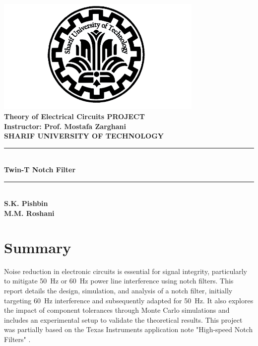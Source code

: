 \documentclass[hidelinks,12pt]{article}
\begin{document}
	
	\begin{titlepage}
		\begin{center}
			\includegraphics[width=10cm]{figures/SUT_logo.png} \\
			\vspace{1cm}
			\textbf{\Large Theory of Electrical Circuits PROJECT}\\
			\vspace{0.5cm}
			\textbf{Instructor: Prof. Mostafa Zarghani}\\
			\vspace{1cm}
			\textbf{SHARIF UNIVERSITY OF TECHNOLOGY}\\
			\vspace{1cm}
			\rule{\linewidth}{0.5mm} \\
			\vspace{0.5cm}
			{\Huge \textbf{Twin-T Notch Filter}}\\
			\vspace{0.3cm}
			\rule{\linewidth}{0.5mm} \\
			\vfill
			\textbf{\Large S.K. Pishbin}
			\\
			\textbf{\Large M.M. Roshani}
		\end{center}
	\end{titlepage}
	
	\tableofcontents
	
	\newpage
	\section{Summary}
	Noise reduction in electronic circuits is essential for signal integrity, particularly to mitigate 50~Hz or 60~Hz power line interference using notch filters. This report details the design, simulation, and analysis of a notch filter, initially targeting 60~Hz interference and subsequently adapted for 50~Hz. It also explores the impact of component tolerances through Monte Carlo simulations and includes an experimental setup to validate the theoretical results. This project was partially based on the Texas Instruments application note "High-speed Notch Filters" \cite{TI_slyt235}.
	
\end{document}

